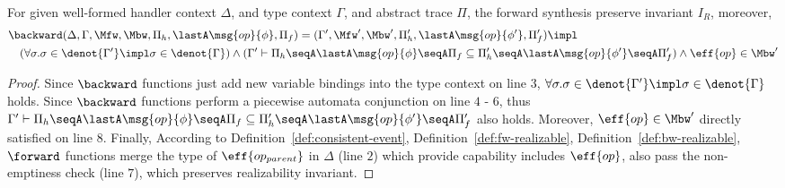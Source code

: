 \begin{lemma}
  \label{lemma:bw-sound}
For given well-formed handler context $\Delta$, and type context $\Gamma$, and abstract trace $\Pi$, the forward synthesis preserve invariant $I_R$, moreover,
{\small\begin{align*} &\backward(\Delta, \Gamma, \Mfw, \Mbw,\Pi_h,
    \lastA \msg{op}{\phi}, \Pi_f) = (\Gamma', \Mfw', \Mbw',\Pi_h',
    \lastA \msg{op}{\phi'}, \Pi_f') \impl \\&\quad (\forall \sigma.
    \sigma \in\denot{\Gamma'} \impl \sigma \in\denot{\Gamma}) \land
    (\Gamma' \vdash \Pi_h \seqA \lastA \msg{op}{\phi} \seqA \Pi_f
    \subseteq \Pi_h' \seqA \lastA \msg{op}{\phi'} \seqA \Pi_f' ) \land
    \eff{op}\in \Mbw' \end{align*}} \end{lemma} \begin{proof} Since
$\backward$ functions just add new variable bindings into the type
context on line $3$,
$\forall \sigma. \sigma \in\denot{\Gamma'} \impl \sigma
\in\denot{\Gamma}$ holds. Since $\backward$ functions perform a
piecewise automata conjunction on line $4$ - $6$, thus
$\Gamma' \vdash \Pi_h \seqA \lastA \msg{op}{\phi} \seqA \Pi_f
\subseteq \Pi_h' \seqA \lastA \msg{op}{\phi'} \seqA \Pi_f' $ also
holds. Moreover, $\eff{op}\in \Mbw'$ directly satisfied on line $8$.
Finally, According to Definition~\ref{def:consistent-event},
Definition~\ref{def:fw-realizable},
Definition~\ref{def:bw-realizable}, $\forward$ functions merge the
type of $\eff{op_{parent}}$ in $\Delta$ (line $2$) which provide
capability includes $\eff{op}$, also pass the non-emptiness check
(line $7$), which preserves realizability invariant. \end{proof}

